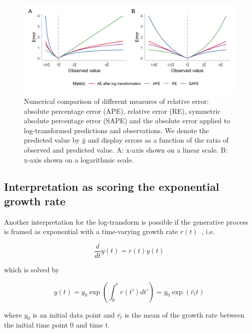 \documentclass{article}
\begin{document}
\begin{figure}[h!]
\centering
\includegraphics[width = 1\textwidth]{output/figures/different-relative-errors.png}
\caption{Numerical comparison of different measures of relative error: absolute percentage error (APE), relative error (RE), symmetric absolute percentage error (SAPE) and the absolute error applied to log-transformed predictions and observations. We denote the predicted value by $\hat{y}$ and display errors as a function of the ratio of observed and predicted value. A: x-axis shown on a linear scale. B: x-axis shown on a logarithmic scale.}
\label{fig:SAPE}
\end{figure}

\subsection{Interpretation as scoring the exponential growth rate}
\label{sec:methods:growthrate}

Another interpretation for the log-transform is possible if the generative process is framed as exponential with a time-varying growth rate $r(t)$~\citep[see, e.g.,][]{wallingaHowGenerationIntervals2007}, i.e.
\begin{linenomath*}
\begin{equation}
\frac{d}{dt}y(t) = r(t)y(t)
\end{equation}
\end{linenomath*}
%
which is solved by
%
\begin{linenomath*}
\begin{equation}
y(t) = y_0 \exp \left( \int_0^t r(t') dt' \right) = y_0 \exp (\bar{r_t}t)
\end{equation}
\end{linenomath*}
where $y_0$ is an initial data point and $\bar{r_t}$ is the mean of the growth rate between the initial time point $0$ and time $t$.
\end{document}

